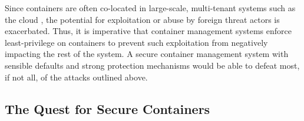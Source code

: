 Since containers are often co-located in large-scale, multi-tenant systems such as the cloud \cite{sultan2019_container_security}, the potential for exploitation or abuse by foreign threat actors is exacerbated. Thus, it is imperative that container management systems enforce least-privilege on containers to prevent such exploitation from negatively impacting the rest of the system. A secure container management system with sensible defaults and strong protection mechanisms would be able to defeat most, if not all, of the attacks outlined above.

\subsection{The Quest for Secure Containers}%
\label{sub:secure_containers}

